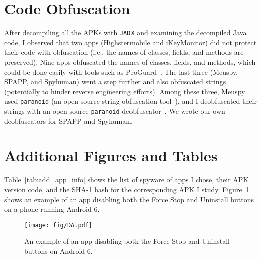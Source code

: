 \section{Code Obfuscation}
\label{sec:apk_obfuscation}

After decompiling all the APKs with \texttt{JADX} and examining the
decompiled Java code, I observed that two apps (Highstermobile and
iKeyMonitor) did not protect their code with obfuscation
(i.e., the names of classes, fields, and methods are preserved). Nine
apps obfuscated the names of classes, fields, and methods, which could
be done easily with tools such as ProGuard~\cite{LeaderIn1:online}.
The last three (Meuspy, SPAPP, and Spyhuman)
went a step further and also obfuscated strings (potentially to hinder
reverse engineering efforts). Among these three, Meuspy used
\texttt{paranoid} (an open source string obfuscation
tool~\cite{MichaelR90:online}), and I deobfuscated their strings with
an open source \texttt{paranoid}
deobfuscator~\cite{giacomof39:online}. We wrote our own deobfuscators
for SPAPP and Spyhuman.


\section{Additional Figures and Tables}
\label{sec:additional_figures}

Table~\ref{tab:add_app_info} shows the list of spyware of apps I chose, their APK version code, and the SHA-1 hash for the corresponding APK I study.
Figure~\ref{fig:da} shows an example of an app disabling both the Force Stop and Uninstall buttons on a phone running Android 6.

\vspace*{2in}
\hspace*{1in}

\begin{figure}[t]
\centering
\texttt{[image: fig/DA.pdf]}
\caption{An example of an app disabling both the
Force Stop and Uninstall buttons on Android 6.}
\label{fig:da}
\end{figure}
